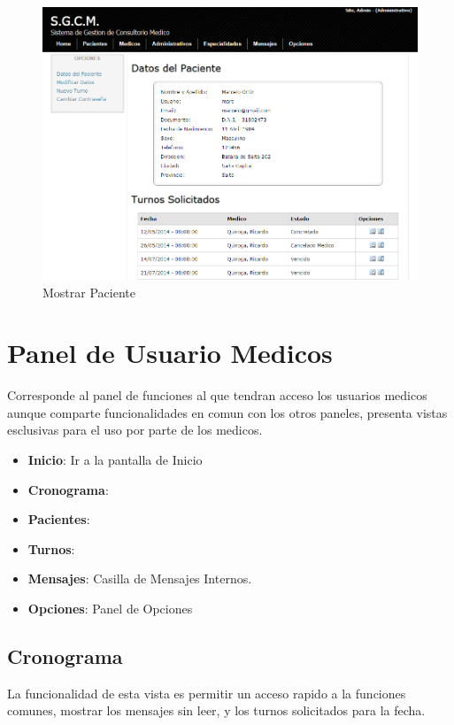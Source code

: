 \begin{figure}[H]
    \centering
    \includegraphics[scale=0.5]{resourse/datos-paciente-a.png}
    \caption{Mostrar Paciente}
    \label{fig:613}
\end{figure}



\section{Panel de Usuario Medicos}

Corresponde al panel de funciones al que tendran acceso los usuarios medicos 
aunque comparte funcionalidades en comun con los otros paneles, presenta vistas
esclusivas para el uso por parte de los medicos.

\begin{itemize}
    \item \textbf{Inicio}: Ir a la pantalla de Inicio
    \item \textbf{Cronograma}: 
    \item \textbf{Pacientes}:
    \item \textbf{Turnos}: 
    \item \textbf{Mensajes}: Casilla de Mensajes Internos.
    \item \textbf{Opciones}: Panel de Opciones
\end{itemize}

\subsection{Cronograma}

La funcionalidad de esta vista es permitir un acceso rapido a la funciones comunes,
mostrar los mensajes sin leer, y los turnos solicitados para la fecha.

